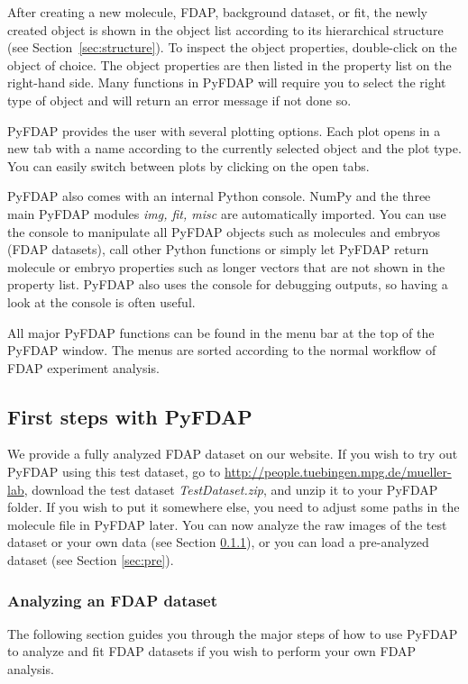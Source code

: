 \documentclass[a4paper,11pt]{article}
\begin{document}
\noindent After creating a new molecule, FDAP, background dataset, or fit, the newly created object is shown in the object list according to its hierarchical structure (see Section~\ref{sec:structure}). To inspect the object properties, double-click on the object of choice. The object properties are then listed in the property list on the right-hand side. Many functions in PyFDAP will require you to select the right type of object and will return an error message if not done so.

PyFDAP provides the user with several plotting options. Each plot opens in a new tab with a name according to the currently selected object and the plot type. You can easily switch between plots by clicking on the open tabs. 

PyFDAP also comes with an internal Python console. NumPy and the three main PyFDAP modules \textit{img, fit, misc} are automatically imported. You can use the console to manipulate all PyFDAP objects such as molecules and embryos (FDAP datasets), call other Python functions or simply let PyFDAP return molecule or embryo properties such as longer vectors that are not shown in the property list. PyFDAP also uses the console for debugging outputs, so having a look at the console is often useful.

All major PyFDAP functions can be found in the menu bar at the top of the PyFDAP window. The menus are sorted according to the normal workflow of FDAP experiment analysis.  

\subsection{First steps with PyFDAP} 
We provide a fully analyzed FDAP dataset on our website. If you wish to try out PyFDAP using this test dataset, go to \url{http://people.tuebingen.mpg.de/mueller-lab}, download the test dataset \textit{TestDataset.zip}, and unzip it to your PyFDAP folder. If you wish to put it somewhere else, you need to adjust some paths in the molecule file in PyFDAP later. You can now analyze the raw images of the test dataset or your own data (see Section \ref{sec:raw}), or you can load a pre-analyzed dataset (see Section \ref{sec:pre}).

\subsubsection{Analyzing an FDAP dataset}
\label{sec:raw}
The following section guides you through the major steps of how to use PyFDAP to analyze and fit FDAP datasets if you wish to perform your own FDAP analysis.
\end{document}
